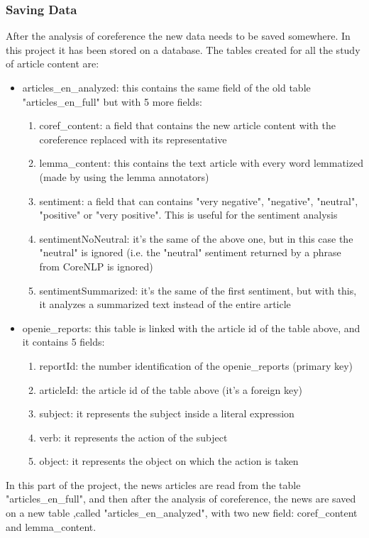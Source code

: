 \subsubsection{Saving Data}
After the analysis of coreference the new data needs to be saved somewhere. In this project it has been stored on a database. The tables created for all the study of article content are:
\begin{itemize}
	\item articles\_en\_analyzed: this contains the same field of the old table "articles\_en\_full" but with 5 more fields:
	\begin{enumerate}
		\item coref\_content: a field that contains the new article content with the coreference replaced with its representative
		\item lemma\_content: this contains the text article with every word lemmatized (made by using the lemma annotators)
		\item sentiment: a field that can contains "very negative", "negative", "neutral", "positive" or "very positive". This is useful for the sentiment analysis
		\item sentimentNoNeutral: it's the same of the above one, but in this case the "neutral" is ignored (i.e. the "neutral" sentiment returned by a phrase from CoreNLP is ignored)
		\item sentimentSummarized: it's the same of the first sentiment, but with this, it analyzes a summarized text instead of the entire article
	\end{enumerate}
	\item openie\_reports: this table is linked with the article id of the table above, and it contains 5 fields:
	\begin{enumerate}
		\item reportId: the number identification of the openie\_reports (primary key)
		\item articleId: the article id of the table above (it's a foreign key)
		\item subject: it represents the subject inside a literal expression
		\item verb: it represents the action of the subject
		\item object: it represents the object on which the action is taken
	\end{enumerate}
\end{itemize}
In this part of the project, the news articles are read from the table "articles\_en\_full", and then after the analysis of coreference, the news are saved on a new table ,called "articles\_en\_analyzed", with two new field: coref\_content and lemma\_content.


